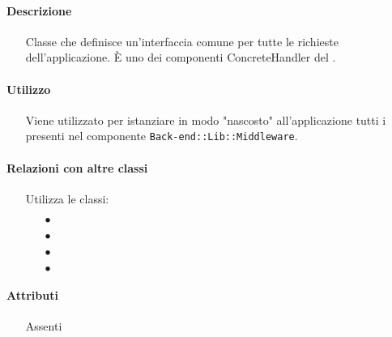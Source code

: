 \paragraph*{Descrizione}
\begin{itemize}
\item[] Classe che definisce un'interfaccia comune per tutte le richieste dell'applicazione. È uno dei componenti ConcreteHandler del  .
\end{itemize}

\paragraph*{Utilizzo}
\begin{itemize}
\item[] Viene utilizzato per istanziare in modo "nascosto" all'applicazione tutti i  presenti nel componente \texttt{Back-end::Lib::Middleware}.
\end{itemize}

\paragraph*{Relazioni con altre classi}
\begin{itemize}


\item[] Utilizza le classi:
\begin{itemize}
\item[$\bullet$] 
\item[$\bullet$] 
\item[$\bullet$] 
\item[$\bullet$] 
\end{itemize}
\end{itemize}

\paragraph*{Attributi}
\begin{itemize}
\item[] Assenti
\end{itemize}

